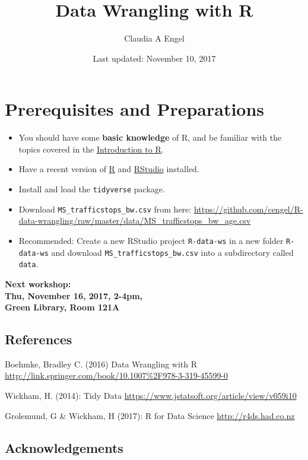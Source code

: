 \documentclass[]{book}
\title{Data Wrangling with R}
\author{Claudia A Engel}
\date{Last updated: November 10, 2017}
\providecommand{\tightlist}{%
  \setlength{\itemsep}{0pt}\setlength{\parskip}{0pt}}
\theoremstyle{definition}
\theoremstyle{definition}
\theoremstyle{definition}
\theoremstyle{remark}
\begin{document}
\maketitle

{
\setcounter{tocdepth}{1}
\tableofcontents
}
\chapter*{Prerequisites and
Preparations}\label{prerequisites-and-preparations}

\begin{itemize}
\tightlist
\item
  You should have some \textbf{basic knowledge} of R, and be familiar
  with the topics covered in the
  \href{https://cengel.github.io/R-intro/}{Introduction to R}.
\item
  Have a recent version of \href{https://cran.r-project.org/}{R} and
  \href{https://www.rstudio.com/}{RStudio} installed.
\item
  Install and load the \texttt{tidyverse} package.
\item
  Download \texttt{MS\_trafficstops\_bw.csv} from here:
  \url{https://github.com/cengel/R-data-wrangling/raw/master/data/MS_trafficstops_bw_age.csv}
\item
  Recommended: Create a new RStudio project \texttt{R-data-ws} in a new
  folder \texttt{R-data-ws} and download
  \texttt{MS\_trafficstops\_bw.csv} into a subdirectory called
  \texttt{data}.
\end{itemize}

\textbf{Next workshop:\\
Thu, November 16, 2017, 2-4pm,\\
Green Library, Room 121A}

\section*{References}\label{references}

Boehmke, Bradley C. (2016) Data Wrangling with R
\url{http://link.springer.com/book/10.1007\%2F978-3-319-45599-0}

Wickham, H. (2014): Tidy Data
\url{https://www.jstatsoft.org/article/view/v059i10}

Grolemund, G \& Wickham, H (2017): R for Data Science
\url{http://r4ds.had.co.nz}

\section*{Acknowledgements}\label{acknowledgements}
\end{document}
